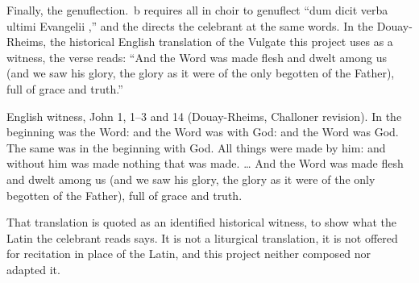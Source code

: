 Finally, the genuflection. \,b requires all in choir to genuflect
``dum dicit verba ultimi Evangelii ,'' and the
 directs the celebrant  at the same
words. In the Douay-Rheims, the historical English translation of the Vulgate
this project uses as a witness, the verse reads: ``And the Word was made flesh
and dwelt among us (and we saw his glory, the glory as it were of the only
begotten of the Father), full of grace and truth.''

\begin{witnesstext}{English witness, John 1, 1--3 and 14 (Douay-Rheims,
Challoner revision).}
In the beginning was the Word: and the Word was with God: and the Word was
God. The same was in the beginning with God. All things were made by him: and
without him was made nothing that was made. \dots{} And the Word was made
flesh and dwelt among us (and we saw his glory, the glory as it were of the
only begotten of the Father), full of grace and truth.
\end{witnesstext}

\noindent
That translation is quoted as an identified historical witness, to show what
the Latin the celebrant reads says. It is not a liturgical translation, it is
not offered for recitation in place of the Latin, and this project neither
composed nor adapted it.
